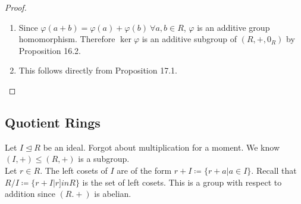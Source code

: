 \documentclass{article}
\newcommand{\coleq}{\coloneqq}
\theoremstyle{definition}
\theoremstyle{remark}
\newcommand{\ideal}{\unlhd}
\begin{document}
{{            \begin{proof}
                \begin{enumerate}
                    \item Since $\varphi(a+b)=\varphi(a)+\varphi(b) \ \forall a,b \in R$, $\varphi$ is an additive group homomorphism. Therefore $\ker\varphi$ is an additive subgroup of $(R,+,0_R)$ by Proposition 16.2.
                    \item This follows directly from Proposition 17.1.
                \end{enumerate}
            \end{proof}
        }
        \subsection*{Quotient Rings}{
            Let $I\ideal R$ be an ideal. Forgot about multiplication for a moment. We know $(I,+)\leq (R,+)$ is a subgroup.\\
            Let $r \in R$. The left cosets of $I$ are of the form $r+I\coleq \{r+a|a \in I\}$. Recall that $R/I\coleq\{r+I|r ]in R\}$ is the set of left cosets. This is a group with respect to addition since $(R.+)$ is abelian.
        }
    }
    
\end{document}
